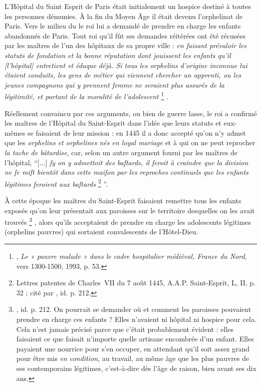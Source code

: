  L'Hôpital du Saint Esprit de Paris était initialement un hospice destiné à toutes les personnes démunies. À la fin du Moyen Âge il était devenu l'orphelinat de Paris. Vers le milieu du  le roi lui a demandé de prendre en charge les enfants abandonnés de Paris. Tout roi qu'il fût ses demandes réitérées ont été récusées par les maîtres de l'un des hôpitaux de sa propre ville : \emph{en faisant prévaloir les statuts de fondation et la bonne réputation dont jouissent les enfants qu'il \emph{[l'hôpital]} entretient et éduque déjà. Si tous les orphelins d'origine inconnue lui étaient conduits, les gens de métier qui viennent chercher un apprenti, ou les jeunes compagnons qui y prennent femme ne seraient plus assurés de la légitimité, et partant de la moralité de l'adolescent}%
\footnote{, \emph{Le « pauvre malade » dans le cadre hospitalier médiéval, France du Nord}, vers 1300-1500, 1993, p. 53.}%
.

 Réellement convaincu par ces arguments, ou bien de guerre lasse, le roi a confirmé les maîtres de l'Hôpital du Saint-Esprit dans l'idée que leurs statuts et eux-mêmes se faisaient de leur mission : en 1445 il a donc accepté qu'on n'y admet que les \emph{orphelins et orphelines nés en loyal mariage} et à qui on ne peut reprocher \emph{la tache de bâtardise}, car, selon un autre argument fourni par les maîtres de l'hôpital, \enquote{[...] \emph{ſy on y admettoit des baſtards, il ſeroit à craindre que la division ne ſe miſt bientôt dans cette maiſon par les reproches continuels que les enfants légitimes feroient aux baſtards}%
\footnote{Lettres patentes de Charles~VII du 7 août 1445, A.A.P. Saint-Esprit, L, II, p. 32 ; cité par , id. p. 212.}%
}.

 À cette époque les maîtres du Saint-Esprit faisaient remettre tous les enfants exposés qu'on leur présentait aux paroisses sur le territoire desquelles on les avait trouvés%
\footnote{, id. p. 212. On pourrait se demander où et comment les paroisses pouvaient prendre en charge ces enfants ? Elles n'avaient ni hôpital ni hospice pour cela. Cela n'est jamais précisé parce que c'était probablement évident : elles faisaient ce que faisait n'importe quelle artisane encombrée d'un enfant. Elles payaient une nourrice pour s'en occuper, en attendant qu'il soit assez grand pour être mis \emph{en condition}, au travail, au même âge que les plus pauvres de ses contemporains légitimes, c'est-à-dire dès l'âge de raison, bien avant ses dix ans.}%
, alors qu'ils acceptaient de prendre en charge les adolescents légitimes (orphelins pauvres) qui sortaient convalescents de l'Hôtel-Dieu. 

